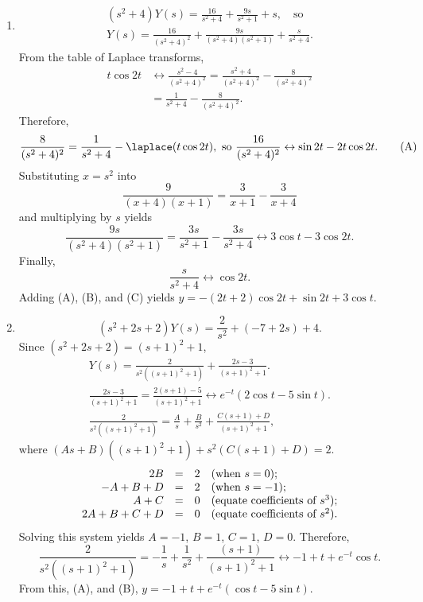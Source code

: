 \documentclass[openany]{book}
\newenvironment{sectionSolutions}{
 \begin{enumerate}[item-label={\thesection.\arabic{enumi}.}]
}{
 \end{enumerate}
}
\begin{document}
\begin{sectionSolutions}
\item
\begin{gather*}
(s^2+4)Y(s)=\frac{16}{ s^2+4}+\frac{9s}{ s^2+1}+s,\quad\text{so}
\\
Y(s)=\frac{16}{ (s^2+4)^2}+\frac{9s}{(s^2+4)(s^2+1)}+\frac{s}{
s^2+4}.
\end{gather*}
From the table of Laplace transforms,
\begin{align*}
t\cos2t&\leftrightarrow\frac{s^2-4}{(s^2+4)^2}=\frac{s^2+4}{(s^2+4)^2}
-\frac{8}{(s^2+4)^2}\\
&=\frac{1}{ s^2+4}-\frac{8}{(s^2+4)^2}.
\end{align*}
Therefore,
\[
\frac{8}{(s^2+4)^2}=\frac{1}{ s^2+4}-\laplace (t\cos2t),
\text{ so }
\frac{16}{(s^2+4)^2}\leftrightarrow\sin2t-2t\cos2t.
\tag{A}
\]
Substituting $x=s^2$ into
\[
\frac{9}{(x+4)(x+1)}=\frac{3}{ x+1}-\frac{3}{ x+4}
\]
and multiplying  by $s$ yields
\[
\frac{9s}{(s^2+4)(s^2+1)}=\frac{3s}{ s^2+1}-\frac{3s}{ s^2+4}
\leftrightarrow 3\cos t-3\cos2t.
\tag{B}
\]
Finally,
\[
\frac{s}{ s^2+4}\leftrightarrow\cos2t.
\tag{C}
\]
Adding (A), (B), and (C) yields
$y=-(2t+2)\cos2t+\sin2t+3\cos t$.


\item
\[
(s^2+2s+2)Y(s)=\frac{2}{ s^2}+(-7+2s)+4.
\]
Since $(s^2+2s+2)=(s+1)^2+1$,
\begin{gather*}
Y(s)=\frac{2}{ s^2((s+1)^2+1)}+\frac{2s-3}{ (s+1)^2+1}.
\tag{A}\\
\frac{2s-3}{ (s+1)^2+1}=\frac{2(s+1)-5}{ (s+1)^2+1}
\leftrightarrow e^{-t}(2\cos t-5\sin t).
\tag{B}\\
\frac{2}{ s^2((s+1)^2+1)}=\frac{A}{ s}+\frac{B}{
s^2}+\frac{C(s+1)+D}{(s+1)^2+1},
\end{gather*}
where
$(As+B)\left((s+1)^2+1\right)+s^2\left(C(s+1)+D\right)=2$.
\[
\begin{array}{rc ll}
2B&=&2&(\text{when }s=0);\\
-A+B+D&=&2&(\text{when }s=-1);\\
A+C&=&0&(\text{equate coefficients of }s^3);\\
2A+B+C+D&=&0&(\text{equate coefficients of }s^2).
\end{array}
\]
Solving this system yields $A=-1$, $B=1$, $C=1$, $D=0$. Therefore,
\[
\frac{2}{ s^2((s+1)^2+1)}=-\frac{1}{ s}+\frac{1}{
s^2}+\frac{(s+1)}{(s+1)^2+1}\leftrightarrow-1+t+e^{-t}\cos t.
\]
From this, (A), and (B),
$y=-1+t+e^{-t}(\cos t-5\sin t)$.



\end{sectionSolutions}
\end{document}
